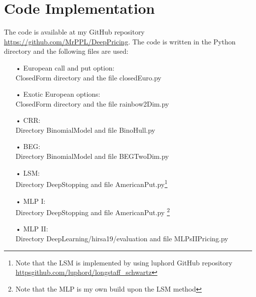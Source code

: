 \chapter{Code Implementation} %

\label{AppendixB} %

The code is available at my GitHub repository \href{https://github.com/MrPPL/DeepPricing}{https://github.com/MrPPL/DeepPricing}. The code is written in the Python directory and the following files are used:
\begin{enumerate}
\item[•] European call and put option:\\
ClosedForm directory and the file closedEuro.py
\item[•] Exotic European options:\\
ClosedForm directory and the file rainbow2Dim.py
\item[•] CRR:\\
Directory BinomialModel and file BinoHull.py
\item[•] BEG:\\
Directory BinomialModel and file BEGTwoDim.py
\item[•] LSM:\\
Directory DeepStopping and file AmericanPut.py\footnote{Note that the LSM is implemented by using luphord GitHub repository \href{https://github.com/luphord/longstaff_schwartz}{https\:\/\/github.com/luphord/longstaff\_schwartz}}
\item[•] MLP I:\\
Directory DeepStopping and file AmericanPut.py \footnote{Note that the MLP is my own build upon the LSM method}
\item[•] MLP II:\\
Directory DeepLearning/hirsa19/evaluation and file MLPsIIPricing.py
\end{enumerate}